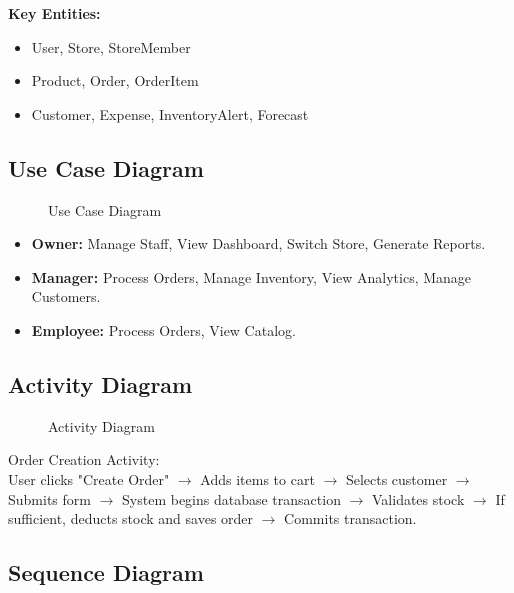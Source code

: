 \documentclass[12pt,a4paper]{report}
\begin{document}
\textbf{Key Entities:}
\begin{itemize}
    \item User, Store, StoreMember
    \item Product, Order, OrderItem
    \item Customer, Expense, InventoryAlert, Forecast
\end{itemize}

\subsection{Use Case Diagram}

\begin{figure}[H]
    \centering
    
    \caption{Use Case Diagram}
\end{figure}

\begin{itemize}
    \item \textbf{Owner:} Manage Staff, View Dashboard, Switch Store, Generate Reports.
    \item \textbf{Manager:} Process Orders, Manage Inventory, View Analytics, Manage Customers.
    \item \textbf{Employee:} Process Orders, View Catalog.
\end{itemize}

\subsection{Activity Diagram}

\begin{figure}[H]
    \centering
    
    \caption{Activity Diagram}
\end{figure}

Order Creation Activity:\\
User clicks "Create Order" $\rightarrow$ Adds items to cart $\rightarrow$ Selects customer $\rightarrow$ Submits form $\rightarrow$ System begins database transaction $\rightarrow$ Validates stock $\rightarrow$ If sufficient, deducts stock and saves order $\rightarrow$ Commits transaction.

\subsection{Sequence Diagram}
\end{document}
